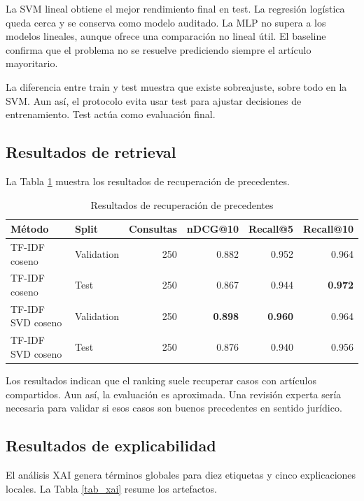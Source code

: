 \documentclass[11pt,a4paper]{article}
\begin{document}
La SVM lineal obtiene el mejor rendimiento final en test. La regresión logística queda cerca y se conserva como modelo auditado. La MLP no supera a los modelos lineales, aunque ofrece una comparación no lineal útil. El baseline confirma que el problema no se resuelve prediciendo siempre el artículo mayoritario.

La diferencia entre train y test muestra que existe sobreajuste, sobre todo en la SVM. Aun así, el protocolo evita usar test para ajustar decisiones de entrenamiento. Test actúa como evaluación final.

\subsection{Resultados de retrieval}

La Tabla \ref{tab_retrieval} muestra los resultados de recuperación de precedentes.

\begin{table}[H]
\centering
\caption{Resultados de recuperación de precedentes}
\label{tab_retrieval}
\small
\begin{tabular}{@{}llrrrr@{}}
\toprule
\textbf{Método} & \textbf{Split} & \textbf{Consultas} & \textbf{nDCG@10} & \textbf{Recall@5} & \textbf{Recall@10}\\
\midrule
TF-IDF coseno & Validation & 250 & 0.882 & 0.952 & 0.964\\
TF-IDF coseno & Test & 250 & 0.867 & 0.944 & \textbf{0.972}\\
TF-IDF SVD coseno & Validation & 250 & \textbf{0.898} & \textbf{0.960} & 0.964\\
TF-IDF SVD coseno & Test & 250 & 0.876 & 0.940 & 0.956\\
\bottomrule
\end{tabular}
\end{table}

Los resultados indican que el ranking suele recuperar casos con artículos compartidos. Aun así, la evaluación es aproximada. Una revisión experta sería necesaria para validar si esos casos son buenos precedentes en sentido jurídico.

\subsection{Resultados de explicabilidad}

El análisis XAI genera términos globales para diez etiquetas y cinco explicaciones locales. La Tabla \ref{tab_xai} resume los artefactos.
\end{document}
